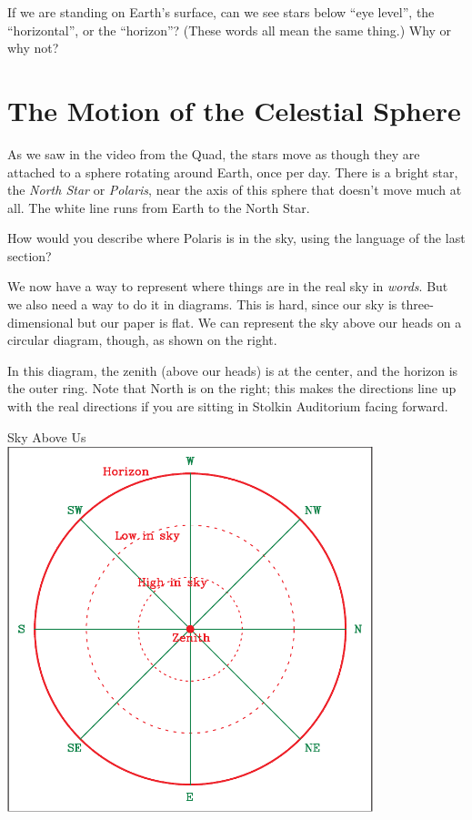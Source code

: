 \documentclass[12pt]{article}
\newcommand{\insp}{\vspace{1in}}
\newcommand{\BS}{\bigskip}
\begin{document}
If we are standing on Earth's surface, can we see stars below ``eye level'', the ``horizontal'', or the ``horizon''? (These words all mean the same thing.) Why or why not?

\insp



\section{The Motion of the Celestial Sphere}

As we saw in the video from the Quad, the stars move as though they are attached to a sphere rotating around Earth, once per day. There is a bright star, the {\it North Star} or {\it Polaris}, near the axis of this sphere that doesn't move much at all. The white line runs from Earth to the North Star.

How would you describe where Polaris is in the sky, using the language of the last section?

\BS\BS\BS\BS

\newpage

\begin{minipage}{0.4\textwidth}
We now have a way to represent where things are in the real sky in {\it words}. But we also need a way to do it in diagrams. This is hard, since our sky is three-dimensional but our paper is flat. We can represent the sky above our heads on a circular diagram, though, as shown on the right.

\bigskip

In this diagram, the zenith (above our heads) is at the center, and the horizon is the outer ring. Note that North is on the right; this makes the directions line up with the real directions if you are sitting in Stolkin Auditorium facing forward.

\end{minipage}
\begin{minipage}{0.6\textwidth}
	\begin{center}
		\large Sky Above Us\\
		\includegraphics[width=0.8\textwidth]{topsky-crop.pdf}
	\end{center}
\end{minipage}
\end{document}
